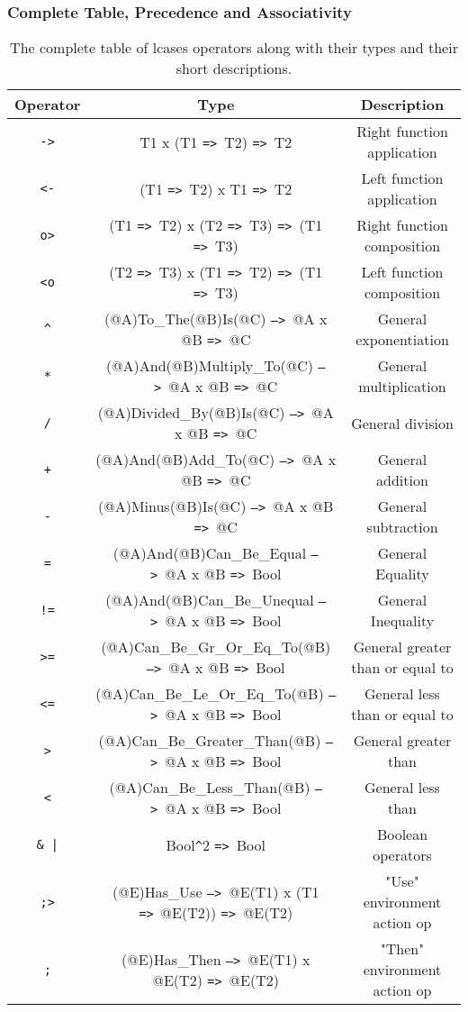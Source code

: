 \documentclass{article}
\def\ra{\texttt{=>}\ }
\def\Ra{\texttt{-->}\ }
\begin{document}
\newpage
\subsubsection{Complete Table, Precedence and Associativity}

\begin{table}[h]

\caption{
The complete table of lcases operators along with their types and 
their short descriptions.
}

\begin{center}
\begin{tabular}{ |c|c|c| } 
\hline
Operator & Type & Description
\\ 
\hline
\hline
\texttt{->} & T1 x (T1 \ra T2) \ra T2 & Right function application
\\
\hline
\texttt{<-} & (T1 \ra T2) x T1 \ra T2 & Left function application
\\
\hline
\texttt{o>} & (T1 \ra T2) x (T2 \ra T3) \ra (T1 \ra T3) &
Right function composition
\\
\hline
\texttt{<o} & (T2 \ra T3) x (T1 \ra T2) \ra (T1 \ra T3) &
Left function composition
\\
\hline
\texttt{\^} & (@A)To_The(@B)Is(@C) \Ra @A x @B \ra @C & General exponentiation
\\
\hline
\texttt{*} & (@A)And(@B)Multiply_To(@C) \Ra @A x @B \ra @C &
General multiplication
\\
\hline
\texttt{/} & (@A)Divided_By(@B)Is(@C) \Ra @A x @B \ra @C & General division
\\
\hline
\texttt{+} & (@A)And(@B)Add_To(@C) \Ra @A x @B \ra @C & General addition
\\ 
\hline
\texttt{-} & (@A)Minus(@B)Is(@C) \Ra @A x @B \ra @C & General subtraction
\\
\hline
\texttt{=} & (@A)And(@B)Can_Be_Equal \Ra @A x @B \ra Bool & General Equality
\\
\hline
\texttt{!=} & (@A)And(@B)Can_Be_Unequal \Ra @A x @B \ra Bool &
General Inequality
\\
\hline
\texttt{>=} & (@A)Can_Be_Gr_Or_Eq_To(@B) \Ra @A x @B \ra Bool
& General greater than or equal to
\\
\hline
\texttt{<=} & (@A)Can_Be_Le_Or_Eq_To(@B) \Ra @A x @B \ra Bool
& General less than or equal to
\\
\hline
\texttt{>} & (@A)Can_Be_Greater_Than(@B) \Ra @A x @B \ra Bool &
General greater than
\\
\hline
\texttt{<} & (@A)Can_Be_Less_Than(@B) \Ra @A x @B \ra Bool & General less than
\\
\hline
\texttt{\& |} & Bool\texttt{\^}2 \ra Bool & Boolean operators
\\
\hline
\texttt{;>} & (@E)Has_Use \Ra @E(T1) x (T1 \ra @E(T2)) \ra @E(T2) &
"Use" environment action op 
\\
\hline
\texttt{;} & (@E)Has_Then \Ra @E(T1) x @E(T2) \ra @E(T2) &
"Then" environment action op
\\
\hline
\end{tabular}
\end{center}

\label{table:allops}

\end{table}
\end{document}
